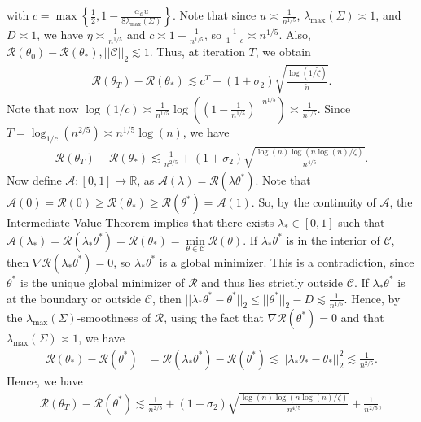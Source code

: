 \documentclass{article}
\begin{document}
with $c = \max\left\{\frac{1}{2}, 1 - \frac{\alpha_{\mathcal{C}} u}{8\lambda_{\max}(\Sigma)}\right\}$. Note that since $u \asymp \frac{1}{n^{1/5}}$, $\lambda_{\max}(\Sigma) \asymp 1$, and $D \asymp 1$, we have $\eta \asymp \frac{1}{n^{1/5}}$ and $c \asymp 1 - \frac{1}{n^{1/5}}$, so $\frac{1}{1 - c} \asymp n^{1/5}$. Also, $\mathcal{R}(\theta_0) - \mathcal{R}(\theta_*), ||\mathcal{C}||_2 \lesssim 1$. Thus, at iteration $T$, we obtain
\begin{align*}
\mathcal{R}(\theta_T) - \mathcal{R}(\theta_*) \lesssim c^T + (1 + \sigma_2)\sqrt{\frac{\log(1/\widetilde{\zeta})}{\widetilde{n}}}.
\end{align*}
Note that now $\log(1/c) \asymp \frac{1}{n^{1/5}}\log\left(\left(1 - \frac{1}{n^{1/5}}\right)^{-n^{1/5}}\right) \asymp \frac{1}{n^{1/5}}$. Since $T = \log_{1/c}\left(n^{2/5}\right) \asymp n^{1/5}\log(n)$, we have
\begin{align*}
\mathcal{R}(\theta_T) - \mathcal{R}(\theta_*) \lesssim \frac{1}{n^{2/5}} + (1 + \sigma_2)\sqrt{\frac{\log(n)\log\left(n\log(n)/\zeta\right)}{n^{4/5}}}.
\end{align*}
Now define $\mathcal{A} : [0, 1] \rightarrow \mathbb{R}$, as $\mathcal{A}(\lambda) = \mathcal{R}(\lambda\theta^*)$. Note that $\mathcal{A}(0) = \mathcal{R}(0) \geq \mathcal{R}(\theta_*) \geq \mathcal{R}(\theta^*) = \mathcal{A}(1)$. So, by the continuity of $\mathcal{A}$, the Intermediate Value Theorem implies that there exists $\lambda_* \in [0, 1]$ such that $\mathcal{A}(\lambda_*) = \mathcal{R}(\lambda_*\theta^*) = \mathcal{R}(\theta_*) = \mathop{\min}\limits_{\theta \in \mathcal{C}}\mathcal{R}(\theta)$. If $\lambda_*\theta^*$ is in the interior of $\mathcal{C}$, then $\nabla\mathcal{R}(\lambda_*\theta^*) = 0$, so $\lambda_*\theta^*$ is a global minimizer. This is a contradiction, since $\theta^*$ is the unique global minimizer of $\mathcal{R}$ and thus lies strictly outside $\mathcal{C}$. If $\lambda_*\theta^*$ is at the boundary or outside $\mathcal{C}$, then $||\lambda_*\theta^* - \theta^*||_2 \leq ||\theta^*||_2 - D \lesssim \frac{1}{n^{1/5}}$. Hence, by the $\lambda_{\max}(\Sigma)$-smoothness of $\mathcal{R}$, using the fact that $\nabla \mathcal{R}(\theta^*) = 0$ and that $\lambda_{\max}(\Sigma) \asymp 1$, we have
\begin{align*}
\mathcal{R}(\theta_*) - \mathcal{R}(\theta^*) &= \mathcal{R}(\lambda_*\theta^*) - \mathcal{R}(\theta^*) \lesssim ||\lambda_*\theta_{*} - \theta_*||_2^2 \lesssim \frac{1}{n^{2/5}}.
\end{align*}
Hence, we have
\begin{align}
\label{eq:best_gamma_AccFW_HT}
\mathcal{R}(\theta_T) - \mathcal{R}(\theta^*) \lesssim \frac{1}{n^{2/5}} + (1 + \sigma_2)\sqrt{\frac{\log(n)\log\left(n\log(n)/\zeta\right)}{n^{4/5}}} + \frac{1}{n^{2/5}},
\end{align}
\end{document}
